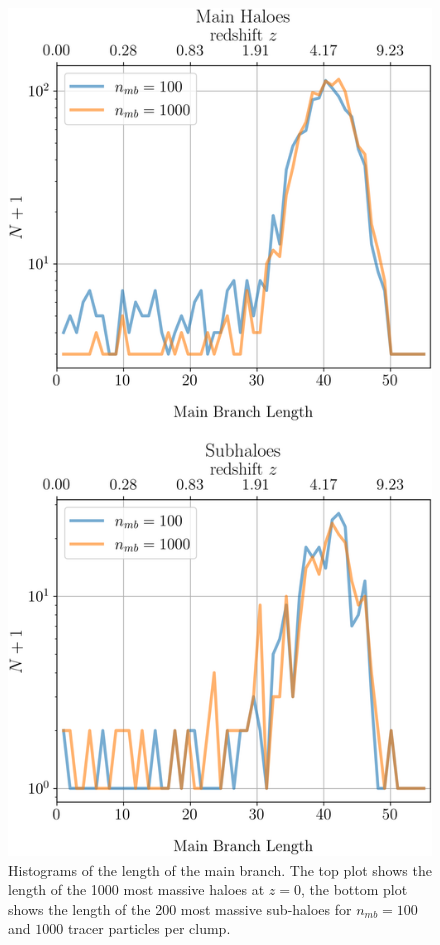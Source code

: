 \begin{figure}
	\centering
	\includegraphics[width=.95\linewidth, 
	keepaspectratio]{images/tree-statistics-sussing-threshold/main-branch-lenghts-all-bins-ntrace.png}%
	\caption{
		Histograms of the length of the main branch. 
		The top plot shows the length of the 1000 most massive haloes at $z = 0$, the bottom plot shows 
		the length of the 200 most massive sub-haloes for $n_{mb} = 100$ and $1000$ tracer particles 
		per clump.
	}%
	\label{fig:sussing-branch-lengths}
\end{figure}


